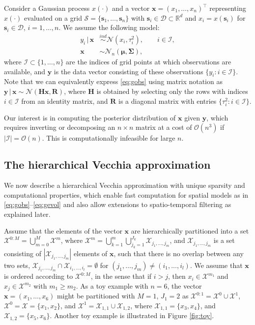 \documentclass[12pt,letterpaper]{article}
\theoremstyle{propstyle}
\theoremstyle{propstyle}
\theoremstyle{propstyle}
\theoremstyle{propstyle}
\theoremstyle{propstyle}
\newcommand{\bs}{\mathbf{s}}
\newcommand{\bx}{\mathbf{x}}
\newcommand{\by}{\mathbf{y}}
\newcommand{\bH}{\mathbf{H}}
\newcommand{\bR}{\mathbf{R}}
\newcommand{\bfmu}{\bm{\mu}}
\newcommand{\bfSigma}{\bm{\Sigma}}
\newcommand{\order}{\mathcal{O}}
\newcommand{\normal}{\mathcal{N}}
\newcommand{\sx}{\mathcal{X}}
\newcommand{\domain}{\mathcal{D}}
\newcommand{\il}{{i_1,\ldots,i_l}}
\newcommand{\jm}{{j_1,\ldots,j_m}}
\newcommand{\grid}{\mathcal{S}}
\newcommand{\obs}{\mathcal{I}}
\begin{document}
Consider a Gaussian process $x(\cdot)$ and a vector $\bx = (x_1, \ldots, x_n)^\top$ representing $x(\cdot)$ evaluated on a grid $\grid = \{\bs_1,\ldots,\bs_n \}$ with $\bs_i \in \domain \subset \mathbb{R}^d$ and $x_i = x(\bs_i)$ for $\bs_i \in \domain$, $i=1,\ldots,n$. We assume the following model:
\begin{align}
\label{eq:gobs} y_{i} \,|\, \bx & \stackrel{ind}{\sim} \normal(x_i,\tau_i^2),\qquad i \in \obs, \\
\label{eq:gevol} \bx  & \sim \normal_n(\bfmu,\bfSigma),
\end{align}
where $\obs \subset \{1,\ldots,n\}$ are the indices of grid points at which observations are available, and $\by$ is the data vector consisting of these observations $\{y_{i}: i \in \obs\}$.
Note that we can equivalently express \eqref{eq:gobs} using matrix notation as $\by \,|\, \bx \sim \normal(\bH\bx,\bR)$, where $\bH$ is obtained by selecting only the rows with indices $i \in \obs$ from an identity matrix, and $\bR$ is a diagonal matrix with entries $\{\tau_i^2: i \in \obs\}$.

Our interest is in computing the posterior distribution of $\bx$ given $\by$, which requires inverting or decomposing an $n \times n$ matrix at a cost of $\order(n^3)$ if $|\obs| = \order(n)$. This is computationally infeasible for large $n$.



\subsection{The hierarchical Vecchia approximation\label{sec:hv-intro}}

We now describe a hierarchical Vecchia approximation with unique sparsity and computational properties, which enable fast computation for spatial models as in \eqref{eq:gobs}--\eqref{eq:gevol} and also allow extensions to spatio-temporal filtering as explained later.

Assume that the elements of the vector $\bx$ are hierarchically partitioned into a set $\sx^{0:M} = \bigcup_{m=0}^M \sx^m$, where $\sx^m = \bigcup_{k=1}^m \bigcup_{j_k=1}^{J_k} \sx_\jm$, and $\sx_\jm$ is a set consisting of $|\sx_\jm|$ elements of $\bx$, such that there is no overlap between any two sets, $\sx_\jm \cap \sx_\il = \emptyset$ for $(\jm) \neq (\il)$. %
We assume that $\bx$ is ordered according to $\sx^{0:M}$, in the sense that if $i>j$, then $x_i \in \sx^{m_1}$ and $x_j \in \sx^{m_2}$ with $m_1 \geq m_2$.
As a toy example with $n=6$, the vector $\bx = (x_1,\ldots,x_6)$ might be partitioned with $M=1$, $J_1 = 2$ as $\sx^{0:1} = \sx^0 \cup \sx^1$, $\sx^0 = \sx = \{x_1,x_2\}$, and $\sx^1 = \sx_{1,1} \cup \sx_{1,2}$, where $\sx_{1,1}=\{x_3,x_4\}$, and $\sx_{1,2} = \{x_5,x_6\}$. Another toy example is illustrated in Figure \ref{fig:toy}.
\end{document}
